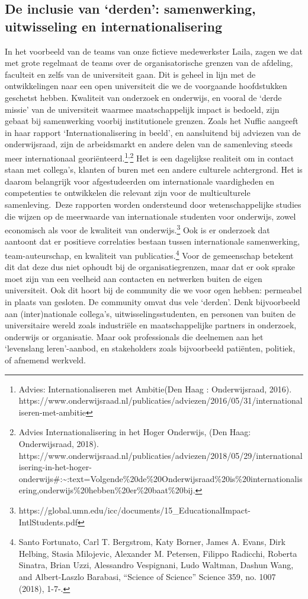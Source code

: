 \documentclass[empirical, authordate, ]{new-jote-article}
\begin{document}
	\subsection{De inclusie van ‘derden': samenwerking, uitwisseling en internationalisering}



	In het voorbeeld van de teams van onze fictieve medewerkster Laila, zagen we dat met grote regelmaat de teams over de organisatorische grenzen van de afdeling, faculteit en zelfs van de universiteit gaan. Dit is geheel in lijn met de ontwikkelingen naar een open universiteit die we de voorgaande hoofdstukken geschetst hebben. Kwaliteit van onderzoek en onderwijs, en vooral de ‘derde missie' van de universiteit waarmee maatschappelijk impact is bedoeld, zijn gebaat bij samenwerking voorbij institutionele grenzen. Zoals het Nuffic aangeeft in haar rapport ‘Internationalisering in beeld', en aansluitend bij adviezen van de onderwijsraad, zijn de arbeidsmarkt en andere delen van de samenleving steeds meer internationaal georiënteerd.\footnote{Advies: Internationaliseren met Ambitie(Den Haag : Onderwijsraad, 2016). https://www.onderwijsraad.nl/publicaties/adviezen/2016/05/31/internationaliseren-met-ambitie}\textsuperscript{,}\footnote{Advies Internationalisering in het Hoger Onderwijs, (Den Haag: Onderwijsraad, 2018). https://www.onderwijsraad.nl/publicaties/adviezen/2018/05/29/internationalisering-in-het-hoger-onderwijs\#:\textasciitilde{}:text=Volgende\%20de\%20Onderwijsraad\%20is\%20internationalisering,onderwijs\%20hebben\%20er\%20baat\%20bij.} Het is een dagelijkse realiteit om in contact staan met collega's, klanten of buren met een andere culturele achtergrond. Het is daarom belangrijk voor afgestudeerden om internationale vaardigheden en competenties te ontwikkelen die relevant zijn voor de multiculturele samenleving. Deze rapporten worden ondersteund door wetenschappelijke studies die wijzen op de meerwaarde van internationale studenten voor onderwijs, zowel economisch als voor de kwaliteit van onderwijs.\footnote{https://global.umn.edu/icc/documents/15\_EducationalImpact-IntlStudents.pdf} Ook is er onderzoek dat aantoont dat er positieve correlaties bestaan tussen internationale samenwerking, team-auteurschap, en kwaliteit van publicaties.\footnote{Santo Fortunato, Carl T. Bergstrom, Katy Borner, James A. Evans, Dirk Helbing, Stasia Milojevic, Alexander M. Petersen, Filippo Radicchi, Roberta Sinatra, Brian Uzzi, Alessandro Vespignani, Ludo Waltman, Dashun Wang, and Albert-Laszlo Barabasi, “Science of Science” Science 359, no. 1007 (2018), 1-7-. } Voor de gemeenschap betekent dit dat deze dus niet ophoudt bij de organisatiegrenzen, maar dat er ook sprake moet zijn van een veelheid aan contacten en netwerken buiten de eigen universiteit. Ook dit hoort bij de community die we voor ogen hebben: permeabel in plaats van gesloten. De community omvat dus vele ‘derden'. Denk bijvoorbeeld aan (inter)nationale collega's, uitwisselingsstudenten, en personen van buiten de universitaire wereld zoals industriële en maatschappelijke partners in onderzoek, onderwijs or organisatie. Maar ook professionals die deelnemen aan het ‘levenslang leren'-aanbod, en stakeholders zoals bijvoorbeeld patiënten, politiek, of afnemend werkveld.
\end{document}
